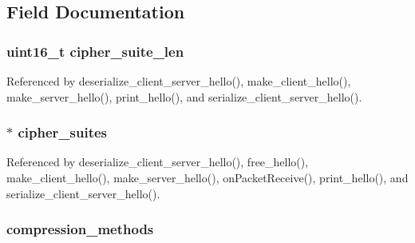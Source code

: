 \subsection{Field Documentation}
\subsubsection[{\texorpdfstring{cipher\+\_\+suite\+\_\+len}{cipher_suite_len}}]{\setlength{\rightskip}{0pt plus 5cm}uint16\+\_\+t cipher\+\_\+suite\+\_\+len}\hypertarget{structserver__client__hello__t_a706adb2fc3f8fa8fe9bdd5793f32183e}{}\label{structserver__client__hello__t_a706adb2fc3f8fa8fe9bdd5793f32183e}


Referenced by deserialize\+\_\+client\+\_\+server\+\_\+hello(), make\+\_\+client\+\_\+hello(), make\+\_\+server\+\_\+hello(), print\+\_\+hello(), and serialize\+\_\+client\+\_\+server\+\_\+hello().

\subsubsection[{\texorpdfstring{cipher\+\_\+suites}{cipher_suites}}]{$\ast$ cipher\+\_\+suites}\hypertarget{structserver__client__hello__t_a545e2b09874bc2250aed603ef61820a6}{}\label{structserver__client__hello__t_a545e2b09874bc2250aed603ef61820a6}


Referenced by deserialize\+\_\+client\+\_\+server\+\_\+hello(), free\+\_\+hello(), make\+\_\+client\+\_\+hello(), make\+\_\+server\+\_\+hello(), on\+Packet\+Receive(), print\+\_\+hello(), and serialize\+\_\+client\+\_\+server\+\_\+hello().

\subsubsection[{\texorpdfstring{compression\+\_\+methods}{compression_methods}}]{ compression\+\_\+methods}\hypertarget{structserver__client__hello__t_a08a470f144044c5ea244590f9ead8165}{}\label{structserver__client__hello__t_a08a470f144044c5ea244590f9ead8165}


